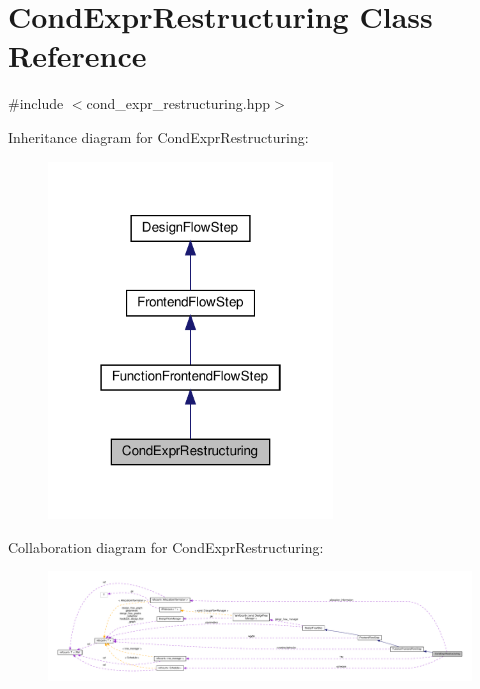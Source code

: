 \hypertarget{classCondExprRestructuring}{}\section{Cond\+Expr\+Restructuring Class Reference}
\label{classCondExprRestructuring}


{\ttfamily \#include $<$cond\+\_\+expr\+\_\+restructuring.\+hpp$>$}



Inheritance diagram for Cond\+Expr\+Restructuring\+:
\nopagebreak
\begin{figure}[H]
\begin{center}
\leavevmode
\includegraphics[width=214pt]{d4/dd7/classCondExprRestructuring__inherit__graph}
\end{center}
\end{figure}


Collaboration diagram for Cond\+Expr\+Restructuring\+:
\nopagebreak
\begin{figure}[H]
\begin{center}
\leavevmode
\includegraphics[width=350pt]{d8/ddd/classCondExprRestructuring__coll__graph}
\end{center}
\end{figure}
